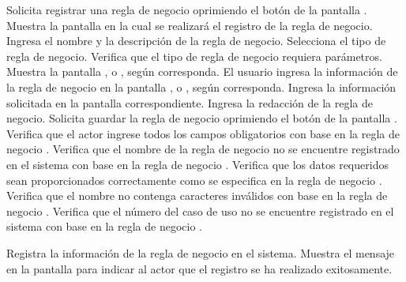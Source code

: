  \begin{UCtrayectoria}
    \UCpaso[\UCactor] Solicita registrar una regla de negocio oprimiendo el botón  de la pantalla .
    \UCpaso[\UCsist] Muestra la pantalla  en la cual se realizará el registro de la regla de negocio. 
    \UCpaso[\UCactor] Ingresa el nombre y la descripción de la regla de negocio. \label{cu8.1:ingresaDatos}
    \UCpaso[\UCactor] Selecciona el tipo de regla de negocio. 
    \UCpaso[\UCsist] Verifica que el tipo de regla de negocio requiera parámetros. 
    \UCpaso[\UCsist] Muestra la pantalla , 
	 o
	, según corresponda.
    \UCpaso[\UCactor] El usuario ingresa la información de la regla de negocio en la pantalla , 
	 o
	, según corresponda.
    \UCpaso[\UCactor] Ingresa la información solicitada en la pantalla correspondiente. \label{cu8:ingresaPaso}
    \UCpaso[\UCactor] Ingresa la redacción de la regla de negocio. \label{cu8.1:descripcion}
    \UCpaso[\UCactor] Solicita guardar la regla de negocio oprimiendo el botón  de la pantalla .  
    \UCpaso[\UCsist] Verifica que el actor ingrese todos los campos obligatorios con base en la regla de negocio  . 
    \UCpaso[\UCsist] Verifica que el nombre de la regla de negocio no se encuentre registrado en el sistema con base en la regla de negocio  . 
    \UCpaso[\UCsist] Verifica que los datos requeridos sean proporcionados correctamente como se especifica en la regla de negocio . 
    \UCpaso[\UCsist] Verifica que el nombre no contenga caracteres inválidos con base en la regla de negocio . 
    \UCpaso[\UCsist] Verifica que el número del caso de uso no se encuentre registrado en el sistema con base en la regla de negocio  . 
    
    \UCpaso[\UCsist] Registra la información de la regla de negocio en el sistema.
    \UCpaso[\UCsist] Muestra el mensaje  en la pantalla 
    para indicar al actor que el registro se ha realizado exitosamente.
 \end{UCtrayectoria}
 
